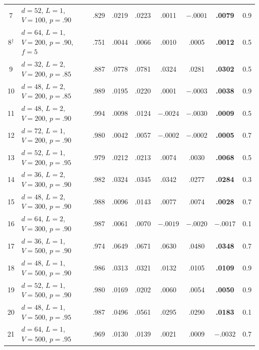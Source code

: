 \begin{table}[t]
\begin{tabular}{@{}cl c cc cc c c@{}}
7  & $d\!=\!52$, $L\!=\!1$, $V\!=\!100$, $p\!=\!.90$ & .829 & .0219 & .0223 & .0011 & $-.0001$ & \textbf{.0079} & 0.9 \\
8$^\dagger$ & $d\!=\!64$, $L\!=\!1$, $V\!=\!200$, $p\!=\!.90$, $f\!=\!5$ & .751 & .0044 & .0066 & .0010 & .0005 & \textbf{.0012} & 0.5 \\
\midrule
9  & $d\!=\!32$, $L\!=\!2$, $V\!=\!200$, $p\!=\!.85$ & .887 & .0778 & .0781 & .0324 & .0281 & \textbf{.0302} & 0.5 \\
10 & $d\!=\!48$, $L\!=\!2$, $V\!=\!200$, $p\!=\!.85$ & .989 & .0195 & .0220 & .0001 & $-.0003$ & \textbf{.0038} & 0.9 \\
11 & $d\!=\!48$, $L\!=\!2$, $V\!=\!200$, $p\!=\!.90$ & .994 & .0098 & .0124 & $-.0024$ & $-.0030$ & \textbf{.0009} & 0.5 \\
\midrule
12 & $d\!=\!72$, $L\!=\!1$, $V\!=\!200$, $p\!=\!.90$ & .980 & .0042 & .0057 & $-.0002$ & $-.0002$ & \textbf{.0005} & 0.7 \\
\midrule
13 & $d\!=\!52$, $L\!=\!1$, $V\!=\!200$, $p\!=\!.95$ & .979 & .0212 & .0213 & .0074 & .0030 & \textbf{.0068} & 0.5 \\
\midrule
14 & $d\!=\!36$, $L\!=\!2$, $V\!=\!300$, $p\!=\!.90$ & .982 & .0324 & .0345 & .0342 & .0277 & \textbf{.0284} & 0.3 \\
15 & $d\!=\!48$, $L\!=\!2$, $V\!=\!300$, $p\!=\!.90$ & .988 & .0096 & .0143 & .0077 & .0074 & \textbf{.0028} & 0.7 \\
16 & $d\!=\!64$, $L\!=\!2$, $V\!=\!300$, $p\!=\!.90$ & .987 & .0061 & .0070 & $-.0019$ & $-.0020$ & \textbf{$-.0017$} & 0.1 \\
\midrule
17 & $d\!=\!36$, $L\!=\!1$, $V\!=\!500$, $p\!=\!.90$ & .974 & .0649 & .0671 & .0630 & .0480 & \textbf{.0348} & 0.7 \\
18 & $d\!=\!48$, $L\!=\!1$, $V\!=\!500$, $p\!=\!.90$ & .986 & .0313 & .0321 & .0132 & .0105 & \textbf{.0109} & 0.9 \\
19 & $d\!=\!52$, $L\!=\!1$, $V\!=\!500$, $p\!=\!.90$ & .980 & .0169 & .0202 & .0060 & .0054 & \textbf{.0050} & 0.9 \\
20 & $d\!=\!48$, $L\!=\!1$, $V\!=\!500$, $p\!=\!.95$ & .987 & .0496 & .0561 & .0295 & .0290 & \textbf{.0183} & 0.1 \\
21 & $d\!=\!64$, $L\!=\!1$, $V\!=\!500$, $p\!=\!.95$ & .969 & .0130 & .0139 & .0021 & .0009 & \textbf{$-.0032$} & 0.7 \\

\end{tabular}
\end{table}
